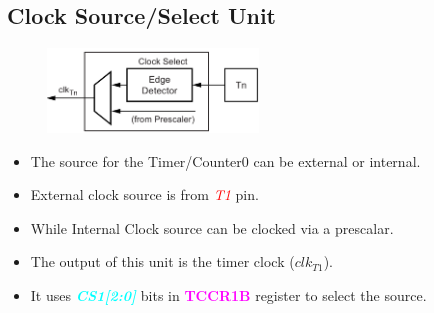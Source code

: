 \documentclass{article}
\newcommand{\bitFormat}[1]{\emph{\textbf{\textcolor{cyan}{#1}}}}
\newcommand{\regFormat}[1]{\textbf{\textcolor{magenta}{#1}}}
\newcommand{\pinFormat}[1]{\emph{\textcolor{red}{#1}}}
\begin{document}
\subsection{Clock Source/Select Unit}
\begin{figure}[H]
    \begin{center}
        \includegraphics[width=0.5\textwidth]{Timer0ClockSelector.png}
    \end{center}
\end{figure}
\begin{itemize}
    \item The source for the Timer/Counter0 can be external or internal.
    \item External clock source is from \pinFormat{T1} pin.
    \item While Internal Clock source can be clocked via a prescalar.
    \item The output of this unit is the timer clock ($clk_{T1}$).
    \item It uses \bitFormat{CS1[2:0]} bits in \regFormat{TCCR1B} register to select the source.
\end{itemize}
\end{document}

